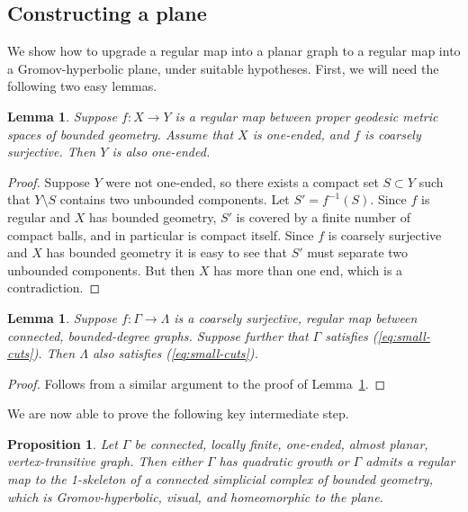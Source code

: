 \documentclass[11pt,a4paper]{amsart}
\newtheorem{proposition}[theorem]{Proposition}
\newtheorem{lemma}[theorem]{Lemma}
\theoremstyle{definition}
\begin{document}
\subsection{Constructing a plane}

We show how to upgrade a regular map into a planar graph to a regular map into a Gromov-hyperbolic plane, under suitable hypotheses. 
First, we will need the following two easy lemmas. 

\begin{lemma}\label{lem:one-ended-regular-maps}
	Suppose $f : X \to Y$ is a regular map between proper geodesic metric spaces of bounded geometry. Assume that $X$ is one-ended, and $f$ is coarsely surjective. Then $Y$ is also one-ended. 
\end{lemma}

\begin{proof}
    Suppose $Y$ were not one-ended, so there exists a compact set $S \subset Y$ such that $Y\setminus S$ contains two unbounded components. Let $S' = f^{-1}(S)$. Since $f$ is regular and $X$ has bounded geometry, $S'$ is covered by a finite number of compact balls, and in particular is compact itself. Since $f$ is coarsely surjective and $X$ has bounded geometry it is easy to see that $S'$ must separate two unbounded components. But then $X$ has more than one end, which is a contradiction. 
\end{proof}

\begin{lemma}\label{lem:small-cuts-regular-maps}
    Suppose $f : \Gamma \to \Lambda$ is a coarsely surjective, regular map between connected, bounded-degree graphs. Suppose further that $\Gamma$ satisfies (\ref{eq:small-cuts}).
    Then $\Lambda$ also satisfies (\ref{eq:small-cuts}).
\end{lemma}

\begin{proof}
    Follows from a similar argument to the proof of Lemma~\ref{lem:one-ended-regular-maps}. 
\end{proof}

We are now able to prove the following key intermediate step.

\begin{proposition}\label{prop:map-into-gromov-hyp-plane}
    Let $\Gamma$ be connected, locally finite, one-ended, almost planar, vertex-transitive graph. Then either $\Gamma$ has quadratic growth or $\Gamma$ admits a regular map to the 1-skeleton of a connected simplicial complex of bounded geometry, which is Gromov-hyperbolic, visual, and homeomorphic to the plane.
\end{proposition}
\end{document}
